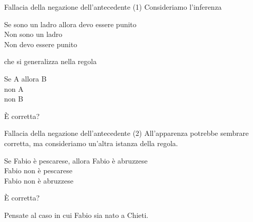 \documentclass[aspectratio=169,10pt,dvipsnames,handout]{beamer}
\begin{document}
\begin{frame}{Fallacia della negazione dell'antecedente (1)}
	Consideriamo l'inferenza
	\begin{center}
		\begin{inference}
			Se sono un ladro allora devo essere punito\\
			Non sono un ladro\\
			\hline
			Non devo essere punito
		\end{inference}
	\end{center}
	che si generalizza nella regola
	\begin{center}
		\begin{inference}
			Se A allora B\\
			non A\\
			\hline
			non B
		\end{inference}
	\end{center}
	È corretta?
\end{frame}

\begin{frame}{Fallacia della negazione dell'antecedente (2)}
	All'apparenza potrebbe sembrare corretta, ma consideriamo un'altra istanza della regola.
	\begin{center}
		\begin{inference}
			Se Fabio è pescarese, allora Fabio è abruzzese \only<3->{\checkmark}\\
			Fabio non è pescarese \only<4->{\checkmark}\\
			\hline
			Fabio non è abruzzese \only<5->{\xmark}
		\end{inference}
	\end{center}
	È corretta?

	\pause
	\medskip
	Pensate al caso in cui Fabio sia nato a Chieti.

\end{frame}
\end{document}
